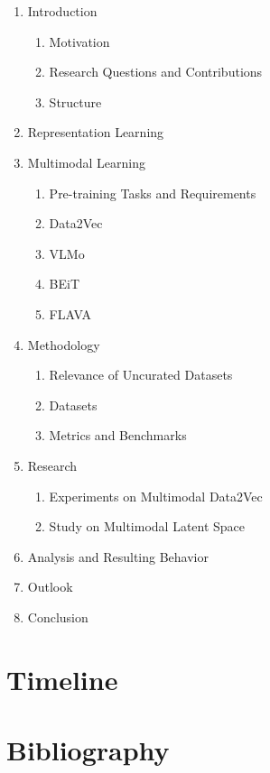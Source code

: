\begin{enumerate}
    \item Introduction
        \begin{enumerate}
            \item Motivation
            \item Research Questions and Contributions
            \item Structure
        \end{enumerate}
    \item Representation Learning
    \item Multimodal Learning
        \begin{enumerate}
            \item Pre-training Tasks and Requirements
            \item Data2Vec
            \item VLMo
            \item BEiT
            \item FLAVA
        \end{enumerate}
    \item Methodology
        \begin{enumerate}
            \item Relevance of Uncurated Datasets
            \item Datasets
            \item Metrics and Benchmarks
        \end{enumerate}
    \item Research
        \begin{enumerate}
            \item Experiments on Multimodal Data2Vec
            \item Study on Multimodal Latent Space
        \end{enumerate}
    \item Analysis and Resulting Behavior
    \item Outlook
    \item Conclusion
\end{enumerate}

\section{Timeline}

\section{Bibliography}